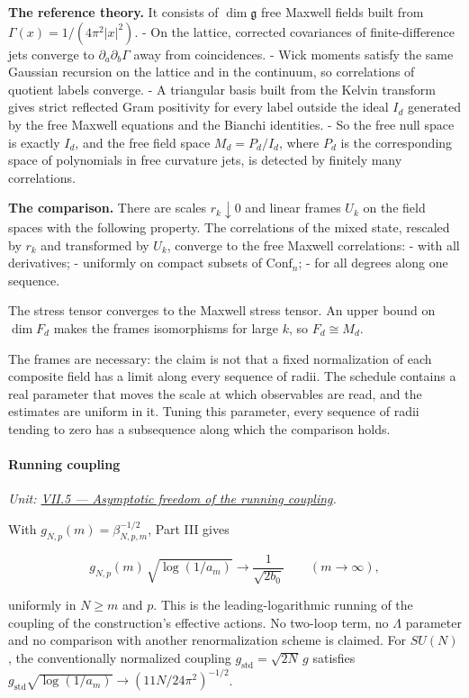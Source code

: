 \documentclass[
  letterpaper,
  11pt]{article}
\begin{document}
\textbf{The reference theory.} It consists of \(\dim\mathfrak g\) free
Maxwell fields built from \(\Gamma(x)=1/(4\pi^2|x|^2)\). - On the
lattice, corrected covariances of finite-difference jets converge to
\(\partial_a\partial_b\Gamma\) away from coincidences. - Wick moments
satisfy the same Gaussian recursion on the lattice and in the continuum,
so correlations of quotient labels converge. - A triangular basis built
from the Kelvin transform gives strict reflected Gram positivity for
every label outside the ideal \(I_d\) generated by the free Maxwell
equations and the Bianchi identities. - So the free null space is
exactly \(I_d\), and the free field space \(M_d=P_d/I_d\), where \(P_d\)
is the corresponding space of polynomials in free curvature jets, is
detected by finitely many correlations.

\textbf{The comparison.} There are scales \(r_k\downarrow0\) and linear
frames \(U_k\) on the field spaces with the following property. The
correlations of the mixed state, rescaled by \(r_k\) and transformed by
\(U_k\), converge to the free Maxwell correlations: - with all
derivatives; - uniformly on compact subsets of \(\mathrm{Conf}_n\); -
for all degrees along one sequence.

The stress tensor converges to the Maxwell stress tensor. An upper bound
on \(\dim F_d\) makes the frames isomorphisms for large \(k\), so
\(F_d\cong M_d\).

The frames are necessary: the claim is not that a fixed normalization of
each composite field has a limit along every sequence of radii. The
schedule contains a real parameter that moves the scale at which
observables are read, and the estimates are uniform in it. Tuning this
parameter, every sequence of radii tending to zero has a subsequence
along which the comparison holds.

\paragraph{Running coupling}\label{running-coupling}

\emph{Unit:
\href{https://github.com/scottnarmstrong/yang-mills-informalization/blob/main/outline/units/VII-5.md}{VII.5
--- Asymptotic freedom of the running coupling}.}

With \(g_{N,p}(m)=\beta_{N,p,m}^{-1/2}\), Part III gives

\[g_{N,p}(m)\,\sqrt{\log(1/a_m)}\longrightarrow\frac1{\sqrt{2b_0}}\qquad(m\to\infty),\]

uniformly in \(N\ge m\) and \(p\). This is the leading-logarithmic
running of the coupling of the construction's effective actions. No
two-loop term, no \(\Lambda\) parameter and no comparison with another
renormalization scheme is claimed. For \(SU(N)\), the conventionally
normalized coupling \(g_{\mathrm{std}}=\sqrt{2N}\,g\) satisfies
\(g_{\mathrm{std}}\sqrt{\log(1/a_m)}\to(11N/24\pi^2)^{-1/2}\).
\end{document}
